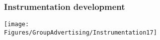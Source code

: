 











\begin{frame}[label=QFM-Measurement]
\frametitle{Instrumentation development}
\centerline{\texttt{[image: \\Figures/GroupAdvertising/Instrumentation17]}}
\end{frame}

